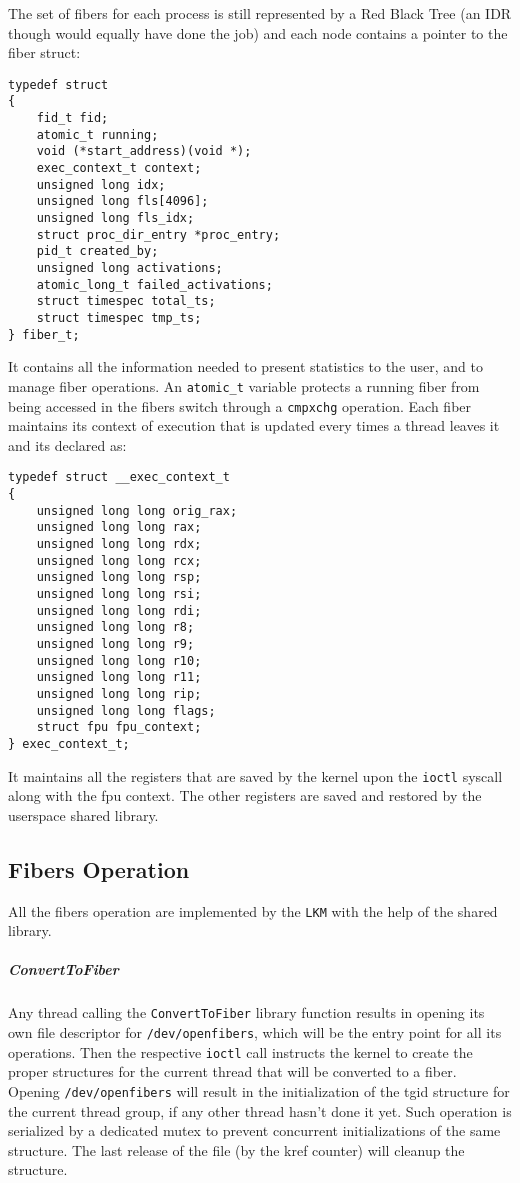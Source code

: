 \documentclass[11pt]{article}
\begin{document}
The set of fibers for each process is still represented by a Red Black Tree (an IDR though would equally have done the job) and each node contains a pointer to the fiber struct:

\begin{lstlisting}
typedef struct
{
    fid_t fid;
    atomic_t running;
    void (*start_address)(void *);
    exec_context_t context;
    unsigned long idx;
    unsigned long fls[4096];
    unsigned long fls_idx;
    struct proc_dir_entry *proc_entry;
    pid_t created_by;
    unsigned long activations;
    atomic_long_t failed_activations;
    struct timespec total_ts;
    struct timespec tmp_ts;
} fiber_t;
\end{lstlisting}

It contains all the information needed to present statistics to the user, and to manage fiber operations. An {\tt atomic\_t} variable protects a running fiber from being accessed in the fibers switch through a {\tt cmpxchg} operation. Each fiber maintains its context of execution that is updated every times a thread leaves it and its declared as:

\begin{lstlisting}
typedef struct __exec_context_t
{
    unsigned long long orig_rax;
    unsigned long long rax;
    unsigned long long rdx;
    unsigned long long rcx;
    unsigned long long rsp;
    unsigned long long rsi;
    unsigned long long rdi;
    unsigned long long r8;
    unsigned long long r9;
    unsigned long long r10;
    unsigned long long r11;
    unsigned long long rip;
    unsigned long long flags;
    struct fpu fpu_context;
} exec_context_t;
\end{lstlisting}
It maintains all the registers that are saved by the kernel upon the {\tt ioctl} syscall along with the fpu context. The other registers are saved and restored by the userspace shared library.

\subsection{Fibers Operation}
All the fibers operation are implemented by the {\tt LKM} with the help of the shared library.

\subparagraph{ConvertToFiber}
Any thread calling the {\tt ConvertToFiber} library function results in opening its own file descriptor for {\tt /dev/openfibers}, which will be the entry point for all its operations. Then the respective {\tt ioctl} call instructs the kernel to create the proper structures for the current thread that will be converted to a fiber. Opening {\tt /dev/openfibers} will result in the initialization of the tgid structure for the current thread group, if any other thread hasn't done it yet. Such operation is serialized by a dedicated mutex to prevent concurrent initializations of the same structure. The last release of the file (by the kref counter) will cleanup the structure.
\end{document}
